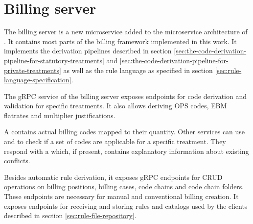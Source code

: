 \section{Billing server}\label{sec:billing-server}
The billing server is a new microservice added to the microservice architecture of \AV.
It contains most parts of the billing framework implemented in this work.
It implements the derivation pipelines described in section \ref{sec:the-code-derivation-pipeline-for-statutory-treatments}
and \ref{sec:the-code-derivation-pipeline-for-private-treatments}
as well as the rule language as specified in section \ref{sec:rule-language-specification}.



The  gRPC service of the billing server exposes endpoints for code derivation and validation for specific treatments.
It also allows deriving OPS codes, EBM flatrates and multiplier justifications.

A  contains actual billing codes mapped to their quantity.
Other services can use  and  to check if a set of codes are applicable for a specific treatment.
They respond with a  which, if present, contains explanatory information about existing conflicts.

Besides automatic rule derivation, it exposes gRPC endpoints for CRUD operations on billing positions, billing cases, code chains and code chain folders.
These endpoints are necessary for manual and conventional billing creation.
It exposes endpoints for receiving and storing rules and catalogs used by the clients described in section \ref{sec:rule-file-repository}.


